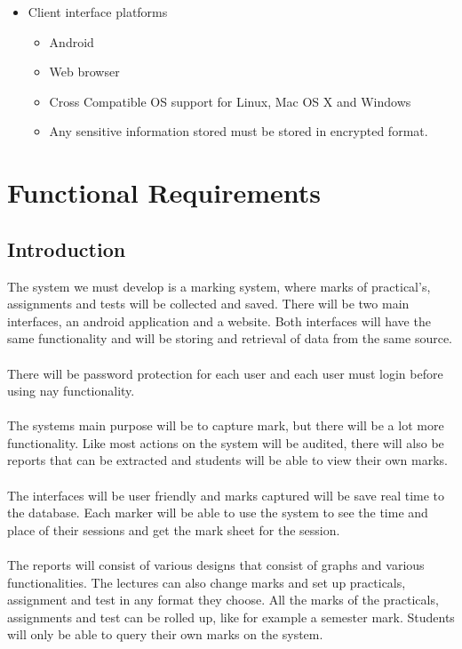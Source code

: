 \documentclass[10pt,a4paper]{article}
\begin{document}
                \begin{itemize}
                        \item Client interface platforms
                                                        \begin{itemize}
                                                                \item Android
                                                                \item Web browser
                                                                \item Cross Compatible OS support for Linux, Mac OS X and Windows
                                                                \item Any sensitive information stored must be stored in encrypted format.
                                                        \end{itemize}                                           
                \end{itemize}                                           
                
\section{Functional Requirements}
\subsection{Introduction}
The system we must develop is a marking system, where marks of practical’s, assignments and tests will be collected and saved. There will be two main interfaces, an android application and a website. Both interfaces will have the same functionality and will be storing and retrieval of data from the same source.\\\\
There will be password protection for each user and each user must login before using nay functionality.\\\\
The systems main purpose will be to capture mark, but there will be a lot more functionality. Like most actions on the system will be audited, there will also be reports that can be extracted and students will be able to view their own marks.\\\\
The interfaces will be user friendly and marks captured will be save real time to the database. Each marker will be able to use the system to see the time and place of their sessions and get the mark sheet for the session.\\\\ 
The reports will consist of various designs that consist of graphs and various functionalities. The lectures can also change marks and set up practicals, assignment and test in any format they choose. All the marks of the practicals, assignments and test can be rolled up, like for example a semester mark. Students will only be able to query their own marks on the system. 
\end{document}
